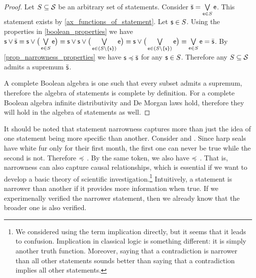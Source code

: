 \documentclass[11pt,letterpaper,fleqn]{memoir} %
\begin{document}
\begin{mathSection}
\begin{proof}
	Let $S \subseteq \stmtSet$ be an arbitrary set of statements. Consider $\bar{\stmt}=\bigOR\limits_{\stmt[e] \in S} \stmt[e]$. This statement exists by \ref{ax_functions_of_statement}. Let $\stmt \in S$. Using the properties in \ref{boolean_properties} we have $\stmt \OR \bar{\stmt} \equiv \stmt \OR \big(\bigOR\limits_{\stmt[e] \in S} \stmt[e] \big) \equiv \stmt \OR \stmt \OR \big(\bigOR\limits_{\stmt[e] \in (S \setminus \{\stmt\})} \stmt[e] \big) \equiv \stmt \OR \big(\bigOR\limits_{\stmt[e] \in (S \setminus \{\stmt\})} \stmt[e] \big) \equiv \bigOR\limits_{\stmt[e] \in S} \stmt[e] = \bar{\stmt}$. By \ref{prop_narrowness_properties} we have $\stmt \narrower \bar{\stmt}$ for any $\stmt \in S$. Therefore any $S \subseteq \stmtSet$ admits a supremum $\bar{\stmt}$.
	
	A complete Boolean algebra is one such that every subset admits a supremum, therefore the algebra of statements is complete by definition. For a complete Boolean algebra infinite distributivity and De Morgan laws hold, therefore they will hold in the algebra of statements as well.
\end{proof}

\end{mathSection}

It should be noted that statement narrowness captures more than just the idea of one statement being more specific than another. Consider  and . Since harp seals have white fur only for their first month, the first one can never be true while the second is not. Therefore  $\narrower$ . By the same token, we also have  $\narrower$ . That is, narrowness can also capture causal relationships, which is essential if we want to develop a basic theory of scientific investigation.\footnote{We considered using the term implication directly, but it seems that it leads to confusion. Implication in classical logic is something different: it is simply another truth function. Moreover, saying that a contradiction is narrower than all other statements sounds better than saying that a contradiction implies all other statements.} Intuitively, a statement is narrower than another if it provides more information when true. If we experimenally verified the narrower statement, then we already know that the broader one is also verified.
\end{document}
